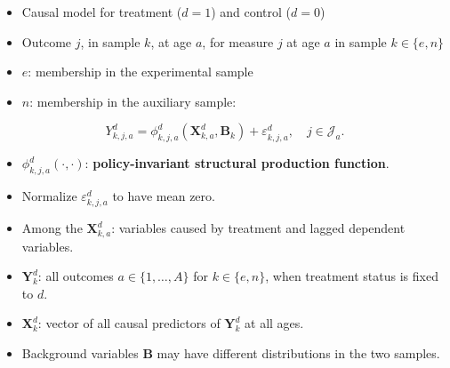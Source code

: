\documentclass[static]{JJH-Beamer}
\begin{document}
\begin{frame}

\begin{itemize}
\item Causal model for treatment ($d=1$) and control ($d=0$)
\item Outcome $j$, in sample $k$, at age $a$, for measure $j$ at age $a$ in sample $k \in \{e,n\}$
\item $e$: membership in the experimental sample
\item $n$: membership in the auxiliary sample:
\end{itemize}

\begin{equation}\label{eq:outcome}
Y^d_{k,j,a} = \phi^d_{k,j,a} (\bm{X}^d_{k,a}, \bm{B}_k) + \varepsilon^d_{k,j,a}, \quad j \in \mathcal{J}_a.
\end{equation}

\end{frame}

\begin{frame}

\begin{itemize}
\item $\phi^d_{k,j,a}\left( \cdot, \cdot \right)$: \textbf{policy-invariant structural production function}.
\item Normalize $\varepsilon^d_{k,j,a}$ to have mean zero.
\item Among the $\bm{X}^d_{k,a}$: variables caused by treatment and lagged dependent variables.
\item $\bm{Y}_k^d$: all outcomes $a\in\{1,\dots,A\}$ for $k \in \{e, n \}$, when treatment status is fixed to $d$.
\item $\bm{X}_k^d$: vector of all causal predictors of $\bm{Y}_k^d$ at all ages.
\item Background variables $\bm{B}$ may have different distributions in the two samples.
\end{itemize}

\end{frame}
\end{document}
